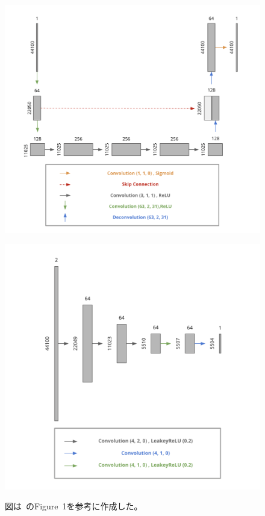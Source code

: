 \begin{figure}[b]
\centering
\begin{minipage}[b]{0.48\columnwidth}
\centering
\includegraphics[width=0.8\columnwidth]{figure/pr_generator.png}
\label{fig:pr_gen}
\end{minipage}
\begin{minipage}[b]{0.48\columnwidth}
\centering
\includegraphics[width=0.8\columnwidth]{figure/pr_discriminator.png}
\label{fig:pr_dis}
\end{minipage}
\caption[本研究の生成モデルと識別モデル]{図は~\cite{u-net}のFigure~1を参考に作成した。}
\end{figure}

